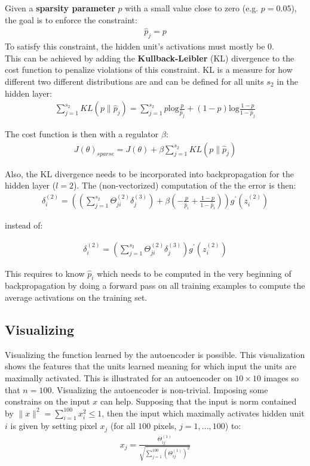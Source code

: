 \documentclass{report}
\begin{document}
Given a {\bf sparsity parameter} $p$ with a small value close to zero (e.g. $p=0.05$), the goal is to enforce the constraint:
\begin{align*}
\hat{p}_j = p
\end{align*}
To satisfy this constraint, the hidden unit's activations must mostly be 0.
\\
This can be achieved by adding the {\bf Kullback-Leibler} (KL) divergence to the cost function to penalize violations of this constraint.
KL is a measure for how different two different distributions are and can be defined for all units $s_2$ in the hidden layer:
\begin{align*}
\sum_{j=1}^{s_2} KL(p\rVert \hat{p}_j) = \sum_{j=1}^{s_2}  p\mbox{log}\frac{p}{\hat{p}_j} + (1-p)\mbox{log}\frac{1-p}{1-\hat{p}_j}
\end{align*}

The cost function is then with a regulator $\beta$:
\begin{align*}
J(\theta)_{sparse} = J(\theta) + \beta \sum_{j=1}^{s_2} KL(p\rVert \hat{p}_j)
\end{align*}

Also, the KL divergence needs to be incorporated into backpropagation for the hidden layer ($l=2$). The (non-vectorized) computation of the the error is then:
\begin{align*}
\delta^{(2)}_i=((\sum_{j=1}^{s_2} \Theta_{ji}^{(2)}\delta_j^{(3)}) + \beta(-\frac{p}{\hat{p}_i}+\frac{1-p}{1-\hat{p}_i}))g^{'}(z_i^{(2)})
\end{align*}


instead of:

\begin{align*}
\delta^{(2)}_i=(\sum_{j=1}^{s_2} \Theta_{ji}^{(2)}\delta_j^{(3)})g^{'}(z_i^{(2)})
\end{align*}

This requires to know $\hat{p}_i$ which needs to be computed in the very beginning of backpropagation by doing a forward pass on all training examples to compute the average activations on the training set.

\subsection{Visualizing}
Visualizing the function learned by the autoencoder is possible.
This visualization shows the features that the units learned meaning for which input the units are maximally activated.
This is illustrated for an autoencoder on $10\times 10$ images so that $n=100$.
Visualizing the autoencoder is non-trivial. Imposing some constrains on the input $x$ can help.
Supposing that the input is norm contained by $\lVert x \rVert^2 = \sum_{i=1}^{100} x_i^2 \le 1$, then the input which maximally activates hidden unit $i$ is given by setting pixel $x_j$ (for all $100$ pixels, $j=1,...,100$) to:
\begin{align*}
x_j = \frac{\Theta_{ij}^{(1)}}{\sqrt{\sum_{j=1}^{100} (\Theta_{ij}^{(1)})^2}}
\end{align*}
\end{document}

